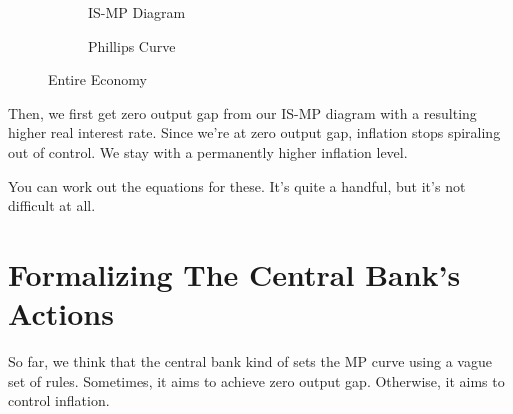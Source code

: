 \documentclass[11pt]{scrartcl}
\newcommand{\og}{\ensuremath{\tilde{Y}}}
\begin{document}
\begin{figure}[H]
\begin{subfigure}[b]{0.5\textwidth}
\centering
{}
\caption{\color{blue}IS-\color{black}MP Diagram}
\end{subfigure}
\hspace{2ex}
\begin{subfigure}[b]{0.5\textwidth}
\centering
{}
\caption{Phillips Curve}
\end{subfigure}
\caption{Entire Economy}
\end{figure}

Then, we first get zero output gap from our IS-MP diagram with a resulting higher real interest rate. Since we're at zero output gap, inflation stops spiraling out of control. We stay with a permanently higher inflation level. 

You can work out the equations for these. It's quite a handful, but it's not difficult at all.

\section{Formalizing The Central Bank's Actions}

So far, we think that the central bank kind of sets the MP curve using a vague set of rules. Sometimes, it aims to achieve zero output gap. Otherwise, it aims to control inflation.
\end{document}
